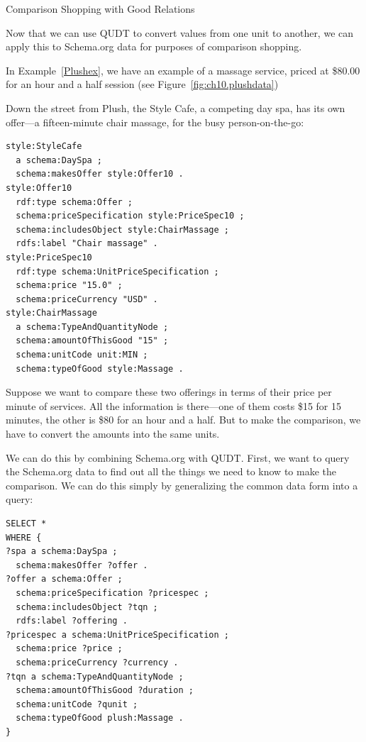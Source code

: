 \begin{challenge}{Comparison Shopping with Good Relations}
\label{chal:38}

Now that we can use QUDT to convert values from one unit to another, we
can apply this to Schema.org data for purposes of comparison
shopping.

In Example~\ref{Plushex}, we have an example of a massage
service, priced at \$80.00 for an hour and a half session (see Figure~\ref{fig:ch10.plushdata})

Down the street from Plush, the Style Cafe, a competing day spa, has 
its own offer---a
fifteen-minute chair massage, for the busy person-on-the-go:

\begin{lstlisting}
style:StyleCafe
  a schema:DaySpa ;
  schema:makesOffer style:Offer10 .
style:Offer10
  rdf:type schema:Offer ;
  schema:priceSpecification style:PriceSpec10 ;
  schema:includesObject style:ChairMassage ;
  rdfs:label "Chair massage" .
style:PriceSpec10
  rdf:type schema:UnitPriceSpecification ;
  schema:price "15.0" ;
  schema:priceCurrency "USD" .
style:ChairMassage
  a schema:TypeAndQuantityNode ;
  schema:amountOfThisGood "15" ;
  schema:unitCode unit:MIN ;  
  schema:typeOfGood style:Massage .
\end{lstlisting}



Suppose we want to compare these two offerings in terms of their price
per minute of services. All the information is there---one of them costs
\$15 for 15 minutes, the other is \$80 for an hour and a half. But to
make the comparison, we have to convert the amounts into the same units.

We can do this by combining Schema.org with QUDT. First, we want to
query the Schema.org data to find out all the things we need to know
to make the comparison. We can do this simply by generalizing the common
data form into a query:

\begin{lstlisting}
SELECT * 
WHERE {
?spa a schema:DaySpa ;
  schema:makesOffer ?offer .
?offer a schema:Offer ;
  schema:priceSpecification ?pricespec ;
  schema:includesObject ?tqn ;
  rdfs:label ?offering .
?pricespec a schema:UnitPriceSpecification ;
  schema:price ?price ;
  schema:priceCurrency ?currency .
?tqn a schema:TypeAndQuantityNode ;
  schema:amountOfThisGood ?duration ;
  schema:unitCode ?qunit ;  
  schema:typeOfGood plush:Massage .
}
\end{lstlisting}


\end{challenge}
